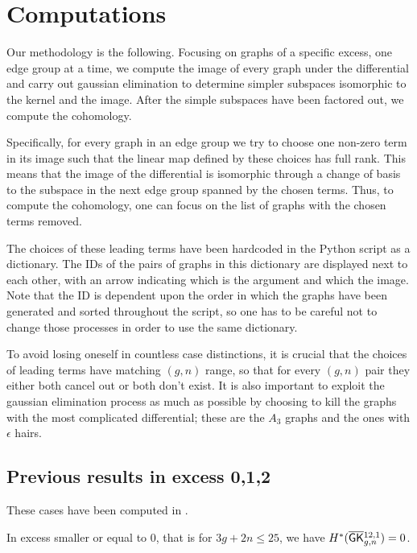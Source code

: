 \section{Computations} \label{sec:Computations}

Our methodology is the following. Focusing on graphs of a specific excess, one edge group at a time, we compute the image of every graph under the differential and carry out gaussian elimination to determine simpler subspaces isomorphic to the kernel and the image.
After the simple subspaces have been factored out, we compute the cohomology.

Specifically, for every graph in an edge group we try to choose one non-zero term in its image such that the linear map defined by these choices has full rank. This means that the image of the differential is isomorphic through a change of basis to the subspace in the next edge group spanned by the chosen terms. Thus, to compute the cohomology, one can focus on the list of graphs with the chosen terms removed.

The choices of these leading terms have been hardcoded in the Python script as a dictionary.
The IDs of the pairs of graphs in this dictionary are displayed next to each other, with an arrow indicating which is the argument and which the image. Note that the ID is dependent upon the order in which the graphs have been generated and sorted throughout the script, so one has to be careful not to change those processes in order to use the same dictionary.

To avoid losing oneself in countless case distinctions, it is crucial that the choices of leading terms have matching $(g,n)$ range, so that for every $(g,n)$ pair they either both cancel out or both don't exist. It is also important to exploit the gaussian elimination process as much as possible by choosing to kill the graphs with the most complicated differential; these are the $A_3$ graphs and the ones with $\epsilon$ hairs.

\subsection{Previous results in excess 0,1,2} 
These cases have been computed in \cite[Section 3]{CLPW2}.

In excess smaller or equal to $0$, that is for $3g + 2n \leq 25$, we have $H^*(\overline{\mathsf{GK}}{}^{12,1}_{g,n}) = 0$.


